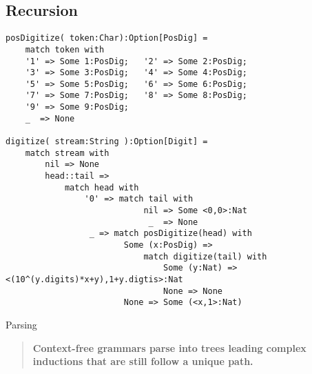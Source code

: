 \subsection{Recursion}
\begin{lstfloat}
\begin{lstlisting}[language=Hidris]
posDigitize( token:Char):Option[PosDig] =
    match token with
    '1' => Some 1:PosDig;   '2' => Some 2:PosDig;   
    '3' => Some 3:PosDig;   '4' => Some 4:PosDig;   
    '5' => Some 5:PosDig;   '6' => Some 6:PosDig;
    '7' => Some 7:PosDig;   '8' => Some 8:PosDig;   
    '9' => Some 9:PosDig;
    _  => None

digitize( stream:String ):Option[Digit] =
    match stream with 
        nil => None
        head::tail => 
            match head with 
                '0' => match tail with 
                            nil => Some <0,0>:Nat
                             _  => None
                 _ => match posDigitize(head) with 
                        Some (x:PosDig) => 
                            match digitize(tail) with 
                                Some (y:Nat) => <(10^(y.digits)*x+y),1+y.digtis>:Nat
                                None => None
                        None => Some (<x,1>:Nat)
\end{lstlisting}
\caption{Parsing}
\end{lstfloat}

\begin{quote}
    \textbf{Context-free grammars parse into trees leading complex inductions 
    that are still follow a  unique path.}
\end{quote}